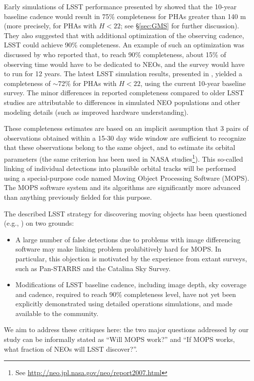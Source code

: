 Early simulations of LSST performance presented by \cite{IvezicNEO2007} showed that the 10-year baseline
cadence would result in 75\% completeness for PHAs greater than 140 m (more  precisely, for PHAs with
$H<22$; see \S\ref{sec:GMS} for further discussion). They also suggested that with additional optimization of the
observing cadence, LSST could achieve 90\% completeness. An example of such an optimization was discussed
by \cite{LSSToverview} who reported that, to reach 90\% completeness, about 15\% of observing time would
have to be dedicated to NEOs, and the survey would have to run for 12 years.
The latest LSST simulation results, presented in \cite{JJI2016}, yielded a completeness of $\sim$72\% for
PHAs with $H<22$, using the current 10-year baseline survey. The minor differences in reported completeness
compared to older LSST studies are attributable to differences in simulated NEO populations and other modeling
details (such as improved hardware understanding).

These completeness estimates are based on an implicit assumption that 3 pairs of observations
obtained within a 15-30 day wide window are sufficient to recognize that these observations belong
to the same object, and to estimate its orbital parameters (the same criterion has been used in NASA
studies\footnote{See \url{http://neo.jpl.nasa.gov/neo/report2007.html}}).
This so-called linking of individual detections into plausible orbital tracks will be performed using a
special-purpose code named Moving Object Processing Software (MOPS). The MOPS software system and its
algorithms are significantly more advanced than anything previously fielded for this purpose.

The described LSST strategy for discovering moving objects has been questioned (e.g., \citealt{GMS2016}) on
two grounds:
\begin{itemize}
\item A large number of false detections due to problems with image differencing software may
make linking problem prohibitively hard for MOPS. In particular, this objection is motivated by the experience
from extant surveys, such as Pan-STARRS and the Catalina Sky Survey.
\item Modifications of LSST baseline cadence, including image depth, sky coverage and cadence,
required to reach 90\% completeness level, have not yet been explicitly demonstrated using detailed
operations simulations, and made available to the community.
\end{itemize}
We aim to address these critiques here: the two major questions addressed by our study can be informally
stated as ``Will MOPS work?'' and ``If MOPS works, what fraction of  NEOs will LSST discover?''.

